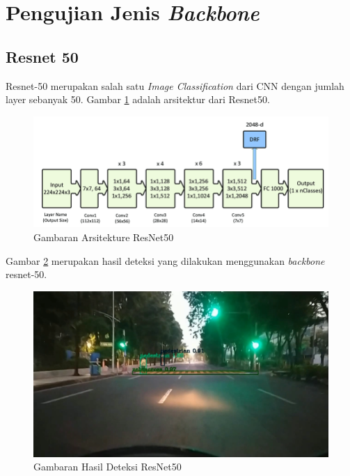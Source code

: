 \section{Pengujian Jenis \textit{Backbone}}
\label{sec:pengujian-backbone}

\subsection{Resnet 50}
\label{resnet50}

Resnet-50 merupakan salah satu \textit{Image Classification} dari CNN dengan jumlah layer sebanyak 50. Gambar \ref{fig:resnet50-arch} adalah arsitektur dari Resnet50.

\begin{figure}[ht]
	\centering
	\includegraphics[scale=0.3]{gambar/resnet50.png}
	\caption{Gambaran Arsitekture ResNet50}
	\label{fig:resnet50-arch}
\end{figure} 

Gambar \ref{fig:resnet50-hasil} merupakan hasil deteksi yang dilakukan menggunakan \textit{backbone} resnet-50.
\begin{figure}[ht]
	\centering
	\includegraphics[scale=0.15]{gambar/hasil-resnet50.png}
	\caption{Gambaran Hasil Deteksi ResNet50}
	\label{fig:resnet50-hasil}
\end{figure} 




